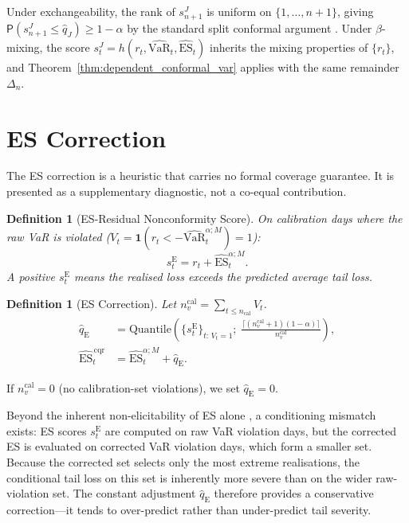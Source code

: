 \documentclass[preprint,11pt,authoryear]{elsarticle}
\newtheorem{definition}[theorem]{Definition}
\newcommand{\VaR}{\mathrm{VaR}}
\newcommand{\ES}{\mathrm{ES}}
\renewcommand{\P}{\mathsf{P}}
\newcommand{\1}{\boldsymbol{1}}
\newcommand{\qE}{\hat{q}_{\scriptscriptstyle\mathrm{E}}}
\newcommand{\EScqr}{\widehat{\ES}^{\,\mathrm{cqr}}}
\begin{document}
	Under exchangeability, the rank of $s_{n+1}^J$ is uniform on $\{1,\ldots,n+1\}$, giving $\P(s_{n+1}^J \le \hat{q}_J) \geq 1 - \alpha$ by the standard split conformal argument \citep{vovk2005algorithmic}. Under $\beta$-mixing, the score $s_t^J = h(r_t, \widehat{\VaR}_t, \widehat{\ES}_t)$ inherits the mixing properties of $\{r_t\}$, and Theorem~\ref{thm:dependent_conformal_var} applies with the same remainder $\Delta_n$.
	
	
	\section{ES Correction}
	\label{app:es}
	
	The ES correction is a heuristic that carries no formal coverage guarantee. It is presented as a supplementary diagnostic, not a co-equal contribution.
	
	\begin{definition}[ES-Residual Nonconformity Score]
		\label{def:es_score}
		On calibration days where the raw VaR is violated ($V_t = \1(r_t < -\widehat{\VaR}_t^{\alpha;M}) = 1$):
		\begin{equation}
			s_t^{\mathrm{E}} = r_t + \widehat{\ES}_t^{\alpha;M}.
			\label{eq:es_score}
		\end{equation}
		A positive $s_t^{\mathrm{E}}$ means the realised loss exceeds the predicted average tail loss.
	\end{definition}
	
	\begin{definition}[ES Correction]
		\label{def:qhat_E}
		Let $n_v^{\mathrm{cal}} = \sum_{t \leq n_{\mathrm{cal}}} V_t$.
		\begin{align}
			\qE &= \mathrm{Quantile}\!\left(
			\{s_t^{\mathrm{E}}\}_{t:\,V_t=1};\;
			\tfrac{\lceil(n_v^{\mathrm{cal}}+1)(1-\alpha)\rceil}
			{n_v^{\mathrm{cal}}}
			\right), \label{eq:qhat_E}\\
			\EScqr_t &= \widehat{\ES}_t^{\alpha;M} + \qE.
			\label{eq:ES_cqr}
		\end{align}
	\end{definition}
	
	If $n_v^{\mathrm{cal}} = 0$ (no calibration-set violations), we set $\qE = 0$.
	
	Beyond the inherent non-elicitability of ES alone \citep{gneiting2011making}, a conditioning mismatch exists: ES scores $s_t^{\mathrm{E}}$ are computed on raw VaR violation days, but the corrected ES is evaluated on corrected VaR violation days, which form a smaller set. Because the corrected set selects only the most extreme realisations, the conditional tail loss on this set is inherently more severe than on the wider raw-violation set. The constant adjustment $\qE$ therefore provides a conservative correction---it tends to over-predict rather than under-predict tail severity.
	
\end{document}
